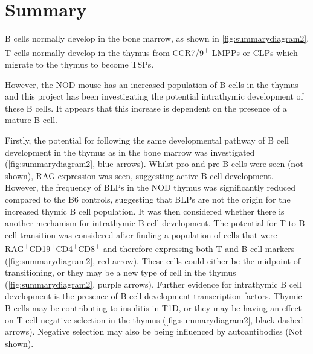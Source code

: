 



\section{Summary}

B cells normally develop in the bone marrow, as shown in \cref{fig:summarydiagram2}.
T cells normally develop in the thymus from CCR7/9\textsuperscript{+} LMPPs or CLPs which migrate to the thymus to become TSPs.

However, the NOD mouse has an increased population of B cells in the thymus and this project has been investigating the potential intrathymic development of these B cells.
It appears that this increase is dependent on the presence of a mature B cell.

Firstly, the potential for following the same developmental pathway of B cell development in the thymus as in the bone marrow was investigated (\cref{fig:summarydiagram2}, blue arrows).
Whilst pro and pre B cells were seen (not shown), RAG expression was seen, suggesting active B cell development.
However, the frequency of BLPs in the NOD thymus was significantly reduced compared to the B6 controls, suggesting that BLPs are not the origin for the increased thymic B cell population.
It was then considered whether there is another mechanism for intrathymic B cell development.
The potential for T to B cell transition was considered after finding a population of cells that were RAG\textsuperscript{+}CD19\textsuperscript{+}CD4\textsuperscript{+}CD8\textsuperscript{+} and therefore expressing both T and B cell markers (\cref{fig:summarydiagram2}, red arrow).
These cells could either be the midpoint of transitioning, or they may be a new type of cell in the thymus (\cref{fig:summarydiagram2}, purple arrows).
Further evidence for intrathymic B cell development is the presence of B cell development transcription factors.
Thymic B cells may be contributing to insulitis in T1D, or they may be having an effect on T cell negative selection in the thymus (\cref{fig:summarydiagram2}, black dashed arrows).
Negative selection may also be being influenced by autoantibodies (Not shown).


